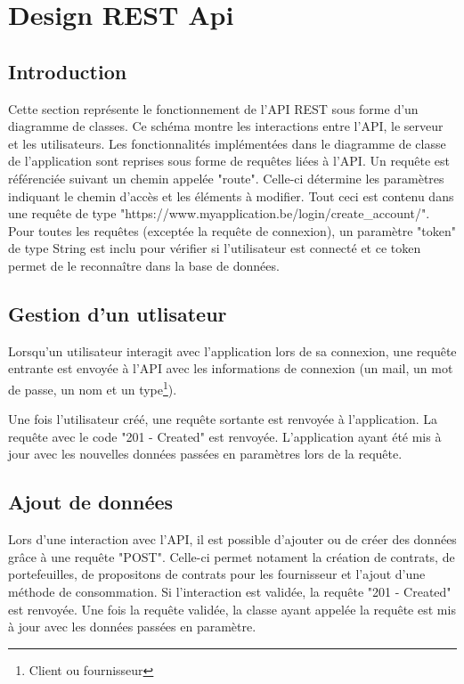 \section{Design REST Api}
\subsection{Introduction}
\begin{flushleft}
Cette section représente le fonctionnement de l'API REST sous forme d'un diagramme de classes. Ce schéma montre les interactions entre l'API, le serveur et les utilisateurs. Les fonctionnalités implémentées dans le diagramme de classe de l'application sont reprises sous forme de requêtes liées à l'API.  Un requête est référenciée suivant un chemin appelée "route". Celle-ci détermine les paramètres indiquant le chemin d'accès et les éléments à modifier. Tout ceci est contenu dans une requête de type "https://www.myapplication.be/login/create_account/". Pour toutes les requêtes (exceptée la requête de connexion), un paramètre "token" de type String est inclu pour vérifier si l'utilisateur est connecté et ce token permet de le reconnaître dans la base de données.
\end{flushleft}

\subsection{Gestion d'un utlisateur}
\begin{flushleft}
Lorsqu'un utilisateur interagit avec l'application lors de sa connexion, une requête entrante est envoyée à l'API avec les informations de connexion (un mail, un mot de passe, un nom et un type\footnote{Client ou fournisseur}).
\end{flushleft}

\begin{flushleft}
Une fois l'utilisateur créé, une requête sortante est renvoyée à l'application. La requête avec le code "201 - Created" est renvoyée. L'application ayant été mis à jour avec les nouvelles données passées en paramètres lors de la requête.
\end{flushleft}

\subsection{Ajout de données}
\begin{flushleft}
Lors d'une interaction avec l'API, il est possible d'ajouter ou de créer des données grâce à une requête "POST". Celle-ci permet notament la création de contrats, de portefeuilles, de propositons de contrats pour les fournisseur et l'ajout d'une méthode de consommation. Si l'interaction est validée, la requête "201 - Created" est renvoyée. Une fois la requête validée, la classe ayant appelée la requête est mis à jour avec les données passées en paramètre.
\end{flushleft}
\newpage
